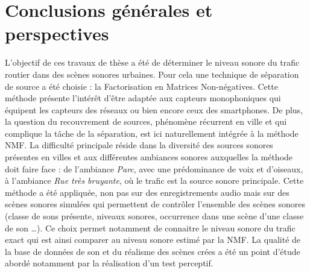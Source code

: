 \chapter*{Conclusions générales et perspectives}
\label{chap:concl}



L'objectif de ces travaux de thèse a été de déterminer le niveau sonore du trafic routier dans des scènes sonores urbaines. Pour cela une technique de séparation de source a été choisie : la Factorisation en Matrices Non-négatives.
Cette méthode présente l'intérêt d'être adaptée aux capteurs monophoniques qui équipent les capteurs des réseaux ou bien encore ceux des smartphones. De plus, la question du recouvrement de sources, phénomène récurrent en ville et qui complique la tâche de la séparation, est ici naturellement intégrée à la méthode NMF. 
La difficulté principale réside dans la diversité des sources sonores présentes en villes et aux différentes ambiances sonores auxquelles la méthode doit faire face : de l'ambiance \textit{Parc}, avec une prédominance de voix et d'oiseaux, à l'ambiance \textit{Rue très bruyante}, où le trafic est la source sonore principale.
Cette méthode a été appliquée, non pas sur des enregistrements audio mais sur des scènes sonores simulées qui permettent de contrôler l'ensemble des scènes sonores (classe de sons présente, niveaux sonores, occurrence dans une scène d'une classe de son \dots). Ce choix permet notamment de connaitre le niveau sonore du trafic exact qui est ainsi comparer au niveau sonore estimé par la NMF. La qualité de la base de données de son et du réalisme des scènes crées a été un point d'étude abordé notamment par la réalisation d'un test perceptif. 




